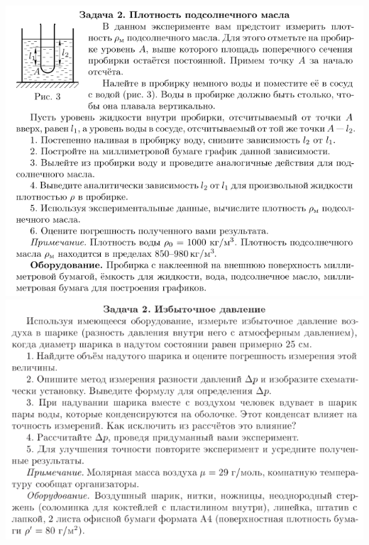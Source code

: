 \begin{center}
  \includegraphics[width=16cm]{exp3}
  \includegraphics[width=16cm]{exp4}
\end{center}

\clearpage

